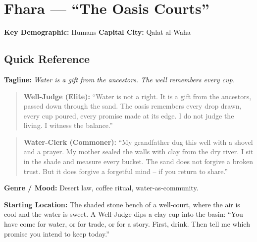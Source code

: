 \section{Fhara --- ``The Oasis Courts''}
\label{chap:fhara}

\textbf{Key Demographic: } Humans
\textbf{Capital City: } Qalat al-Waha

\subsection*{Quick Reference}
\textbf{Tagline:} \textit{Water is a gift from the ancestors. The well remembers every cup.}

\begin{quote}
  \textbf{Well-Judge (Elite):}  
  ``Water is not a right. It is a gift from the ancestors, passed down through the sand. The oasis remembers every drop drawn, every cup poured, every promise made at its edge. I do not judge the living. I witness the balance.''
\end{quote}

\begin{quote}
  \textbf{Water-Clerk (Commoner):}  
  ``My grandfather dug this well with a shovel and a prayer. My mother sealed the walls with clay from the dry river. I sit in the shade and measure every bucket. The sand does not forgive a broken trust. But it does forgive a forgetful mind -- if you return to share.''
\end{quote}

\textbf{Genre / Mood:} Desert law, coffee ritual, water-as-community.

\textbf{Starting Location:} The shaded stone bench of a well-court, where the air is cool and the water is sweet. A Well-Judge dips a clay cup into the basin: ``You have come for water, or for trade, or for a story. First, drink. Then tell me which promise you intend to keep today.''

